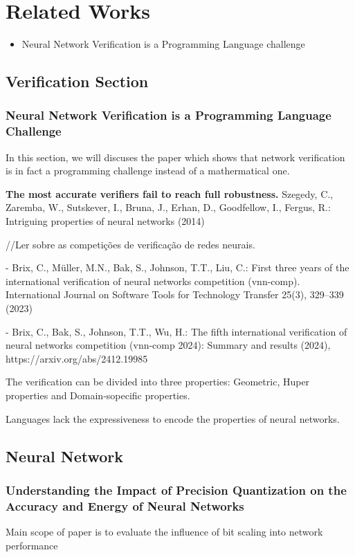 \chapter{Related Works} \label{chap:related_works}

\begin{itemize}
    \item Neural Network Verification is a Programming Language challenge 
\end{itemize}

\section{Verification Section}
\subsection{Neural Network Verification is a Programming Language Challenge}

In this section, we will discuses the paper \cite{cordeiro2025neuralnetworkverificationprogramming} which shows that network verification is in fact a programming challenge instead of a mathermatical one.

\textbf{The most accurate verifiers fail to reach full robustness.}
Szegedy, C., Zaremba, W., Sutskever, I., Bruna, J., Erhan, D., Goodfellow, I., Fergus, R.: Intriguing properties of neural networks (2014)


//Ler sobre as competições de verificação de redes neurais.


- Brix, C., Müller, M.N., Bak, S., Johnson, T.T., Liu, C.: First three years of the international verification of neural networks competition (vnn-comp). International Journal on Software Tools for Technology Transfer 25(3), 329–339 (2023)

- Brix, C., Bak, S., Johnson, T.T., Wu, H.: The fifth international verification of neural networks competition (vnn-comp 2024): Summary and results (2024), https://arxiv.org/abs/2412.19985

The verification can be divided into three properties: Geometric, Huper properties and Domain-sopecific properties. 

Languages lack the expressiveness to encode the properties of neural networks.


\section{Neural Network}
\subsection{Understanding the Impact of Precision Quantization  on the Accuracy and Energy of Neural Networks}
Main scope of paper is to evaluate the influence of bit scaling into network performance


